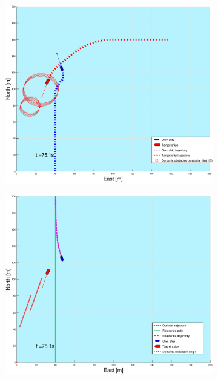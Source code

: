 \begin{figure}[ht]\ContinuedFloat
    \begin{subfigure}[b]{0.49\textwidth}
        \centering
        \includegraphics[width=\textwidth]{Images/Figures/sving_HO/_Simple_1fig1_time=75}
    \end{subfigure}
    \hfill
    \begin{subfigure}[b]{0.499\textwidth}
        \centering
        \includegraphics[width=\textwidth]{Images/Figures/sving_HO/_Simple_1fig999_time=75}

\end{subfigure}
\end{figure}
